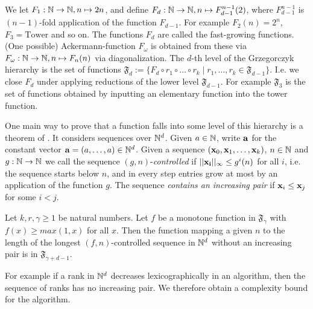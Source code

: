
We let \(F_1: \mathbb{N} \to \mathbb{N}, n \mapsto 2n\), and define \(F_d: \mathbb{N} \to \mathbb{N}, n \mapsto F_{d-1}^{n-1}(2)\), where \(F_{d-1}^{n-1}\) is \((n-1)\)-fold application of the function \(F_{d-1}\). For example \(F_2(n)=2^n\), \(F_3=\text{Tower}\) and so on. The functions \(F_d\) are called the fast-growing functions. (One possible) Ackermann-function \(F_{\omega}\) is obtained from these via \(F_{\omega}: \mathbb{N} \to \mathbb{N}, n \mapsto F_n(n)\) via diagonalization. The \(d\)-th level of the Grzegorczyk hierarchy \cite{Schmitz16} is the set of functions \(\mathfrak{F}_d:=\{F_{d} \circ r_1 \circ \dots \circ r_k \mid r_1, \dots, r_k \in \mathfrak{F}_{d-1}\}\). I.e. we close \(F_d\) under applying reductions of the lower level \(\mathfrak{F}_{d-1}\). For example \(\mathfrak{F}_3\) is the set of functions obtained by inputting an elementary function into the tower function.

One main way to prove that a function falls into some level of this hierarchy is a theorem of \cite{FigueiraFSS11}. It considers sequences over \(\mathbb{N}^d\). Given \(a \in \mathbb{N}\), write \(\mathbf{a}\) for the constant vector \(\mathbf{a}=(a,\dots, a) \in \mathbb{N}^d\). Given a sequence \((\mathbf{x}_0, \mathbf{x}_1, \dots, \mathbf{x}_k)\), \(n \in \mathbb{N}\) and \(g: \mathbb{N} \to \mathbb{N}\) we call the sequence \((g,n)\)-\emph{controlled} if \(||\mathbf{x_i}||_{\infty} \leq g^i(n)\) for all \(i\), i.e. the sequence starts below \(n\), and in every step entries grow at most by an application of the function \(g\). The sequence \emph{contains an increasing pair} if \(\mathbf{x}_i \leq \mathbf{x}_j\) for some \(i<j\).

\begin{proposition} \label{PropositionFastGrowingComplexity}
Let \(k,r, \gamma \geq 1\) be natural numbers. Let \(f\) be a monotone function in \(\mathfrak{F}_{\gamma}\) with \(f(x) \geq max(1,x)\) for all \(x\). Then the function mapping a given \(n\) to the length of the longest \((f,n)\)-controlled sequence in \(\mathbb{N}^d\) without an increasing pair is in \(\mathfrak{F}_{\gamma+d-1}\).
\end{proposition}

For example if a rank in \(\mathbb{N}^d\) decreases lexicographically in an algorithm, then the sequence of ranks has no increasing pair. We therefore obtain a complexity bound for the algorithm.